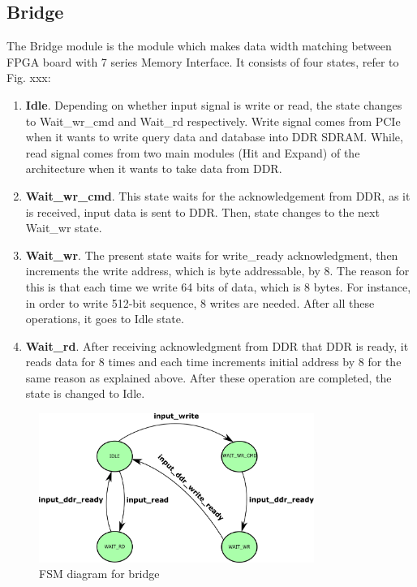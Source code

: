 \subsection{Bridge}
\quad The Bridge module is the module which makes data width matching between FPGA board with 7 series Memory Interface. It consists of four states, refer to Fig. xxx:
\begin{enumerate}
\item \textbf{Idle}. Depending on whether input signal is write or read, the state changes to Wait\_wr\_cmd and Wait\_rd respectively. Write signal comes from PCIe when it wants to write query data and database into DDR SDRAM. While, read signal comes from two main modules (Hit and Expand) of the architecture when it wants to take data from DDR.
\item \textbf{Wait\_wr\_cmd}. This state waits for the acknowledgement from DDR, as it is received, input data is sent to DDR. Then, state changes to the next Wait\_wr state.
\item \textbf{Wait\_wr}. The present state waits for write\_ready acknowledgment, then increments the write address, which is byte addressable, by 8. The reason for this is that each time we write 64 bits of data, which is 8 bytes. For instance, in order to write 512-bit sequence, 8 writes are needed. After all these operations, it goes to Idle state.
\item \textbf{Wait\_rd}. After receiving acknowledgment from DDR that DDR is ready, it reads data for 8 times and each time increments initial address by 8 for the same reason as explained above. After these operation are completed, the state is changed to Idle. 
\end{enumerate}


\begin{figure}
\centering
\includegraphics[width=0.8\textwidth]{Figures/bridgeFSM.pdf}
\caption{FSM diagram for bridge} \label{fig:bridge}
\end{figure}

